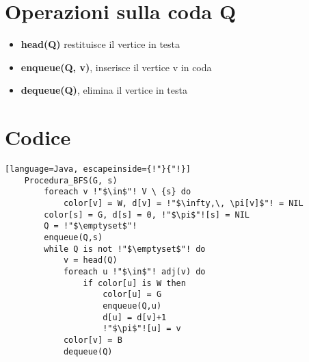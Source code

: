 \section{Operazioni sulla coda Q}
\begin{itemize}
    \item \textbf{head(Q)} restituisce il vertice in testa
    \item \textbf{enqueue(Q, v)}, inserisce il vertice v in coda
    \item \textbf{dequeue(Q)}, elimina il vertice in testa
\end{itemize}
\section{Codice}
\begin{lstlisting}[language=Java, escapeinside={!"}{"!}]
    Procedura_BFS(G, s)
        foreach v !"$\in$"! V \ {s} do
            color[v] = W, d[v] = !"$\infty,\, \pi[v]$"! = NIL
        color[s] = G, d[s] = 0, !"$\pi$"![s] = NIL
        Q = !"$\emptyset$"!
        enqueue(Q,s)
        while Q is not !"$\emptyset$"! do
            v = head(Q)
            foreach u !"$\in$"! adj(v) do
                if color[u] is W then
                    color[u] = G
                    enqueue(Q,u)
                    d[u] = d[v]+1
                    !"$\pi$"![u] = v
            color[v] = B
            dequeue(Q)
\end{lstlisting}
